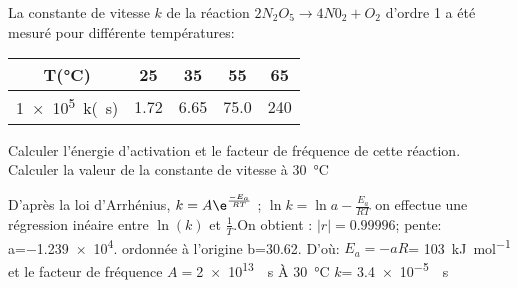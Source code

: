 \begin{Exercise}[title=Loi d'Arrhénius]
	La constante de vitesse $k$ de la réaction $2N_2O_5 \to 4 N0_2 +O_2$ d'ordre 1  a été mesuré pour différente températures:
	\begin{center}
		\begin{tabular}{|c|c|c|c|c|}
			\hline
			T(\si{\celsius})         & 25   & 35   & 55   & 65  \\
			\hline
			\SI{1e5}{k}(\si{\per\s}) & 1.72 & 6.65 & 75.0 & 240 \\
			\hline
		\end{tabular}
	\end{center}
	\Question Calculer l'énergie d'activation et le facteur de fréquence de cette réaction.
	\Question Calculer la valeur de la constante de vitesse à \SI{30}{\celsius}
\end{Exercise}
\begin{Answer}
	\Question D'après la loi d'Arrhénius, $k = A \e^{\frac{-E_a}{RT}}$ ; $\ln{k}=\ln{a}-\frac{E_a}{RT}$ on effectue une régression inéaire entre $\ln(k)$ et $\frac{1}{T}$.On obtient : $|r| = 0.99996$; pente: a=\num{-1.239e4}. ordonnée à l'origine b=\num{30.62}. 
	D'où: $E_a= -aR$= \SI{103}{\kilo\J\per\mol} et le facteur de fréquence $A=$\SI{2e13}{\per\s}
	\Question À \SI{30}{\celsius} $k$= \SI{3.4e-5}{\per\s}
\end{Answer}
